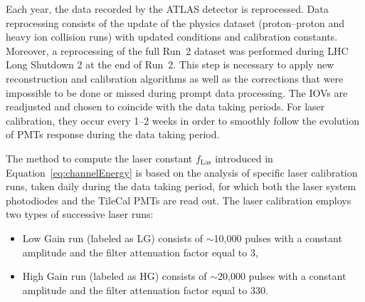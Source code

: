 Each year, the data recorded by the ATLAS detector is reprocessed. Data reprocessing consists of the update of the physics dataset (proton--proton and heavy ion collision runs) with updated conditions and calibration constants. Moreover, a reprocessing of the full Run~2 dataset was performed during LHC Long Shutdown 2 at the end of Run~2. This step is necessary to apply new reconstruction and calibration algorithms as well as the corrections that were impossible to be done or missed during prompt data processing. The IOVs are readjusted and chosen to coincide with the data taking periods. For laser calibration, they occur every 1--2 weeks in order to smoothly follow the evolution of PMTs response during the data taking period. 

The method to compute the laser constant $f_{\mathrm{Las}}$ introduced in Equation~\ref{eq:channelEnergy} is based on the analysis of specific laser calibration runs, taken daily during the data taking period, for which both the laser system photodiodes and the TileCal PMTs are read out. The laser calibration employs two types of successive laser runs:
\begin{itemize}
  \item Low Gain run (labeled as LG) consists of $\sim$10,000 pulses with a constant amplitude and the filter attenuation factor equal to 3,
  \item High Gain run (labeled as HG) consists of $\sim$20,000 pulses with a constant amplitude and the filter attenuation factor equal to 330.
\end{itemize}

